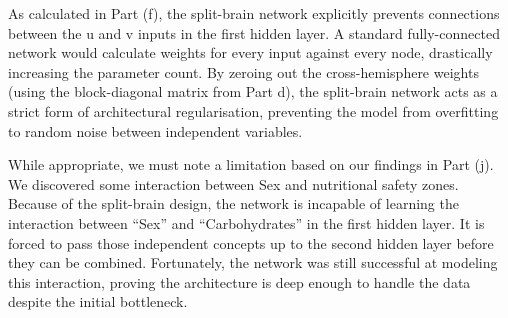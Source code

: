 \documentclass[12pt,halfline,a4paper,]{ouparticle}
\begin{document}
As calculated in Part (f), the split-brain network explicitly prevents
connections between the u and v inputs in the first hidden layer. A
standard fully-connected network would calculate weights for every input
against every node, drastically increasing the parameter count. By
zeroing out the cross-hemisphere weights (using the block-diagonal
matrix from Part d), the split-brain network acts as a strict form of
architectural regularisation, preventing the model from overfitting to
random noise between independent variables.

While appropriate, we must note a limitation based on our findings in
Part (j). We discovered some interaction between Sex and nutritional
safety zones. Because of the split-brain design, the network is
incapable of learning the interaction between ``Sex'' and
``Carbohydrates'' in the first hidden layer. It is forced to pass those
independent concepts up to the second hidden layer before they can be
combined. Fortunately, the network was still successful at modeling this
interaction, proving the architecture is deep enough to handle the data
despite the initial bottleneck.
\end{document}
